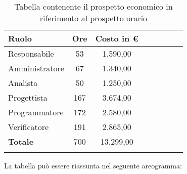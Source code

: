 			\begin{longtable}{|l|c|c|c|c|c|c|c|}
				\hline
				\rowcolor{lighter-grayer}
				\textbf{Ruolo} & \textbf{Ore} & \textbf{Costo in €} \\
				\hline
				\endfirsthead
				
				\hline
				Responsabile & 53 & 1.590,00\\
				\hline
				\hline
				Amministratore & 67 & 1.340,00\\
				\hline
				\hline
				Analista & 50 & 1.250,00\\
				\hline
				\hline
				Progettista & 167 & 3.674,00\\
				\hline
				\hline
				Programmatore & 172 & 2.580,00\\
				\hline
				\hline
				Verificatore & 191 & 2.865,00\\
				\hline
				\textbf{Totale} & 700 & 13.299,00\\
				\hline
				\caption{Tabella contenente il prospetto economico in riferimento al prospetto orario}
			\end{longtable}
			\pagebreak
		
			La tabella può essere riassunta nel seguente areogramma:

		